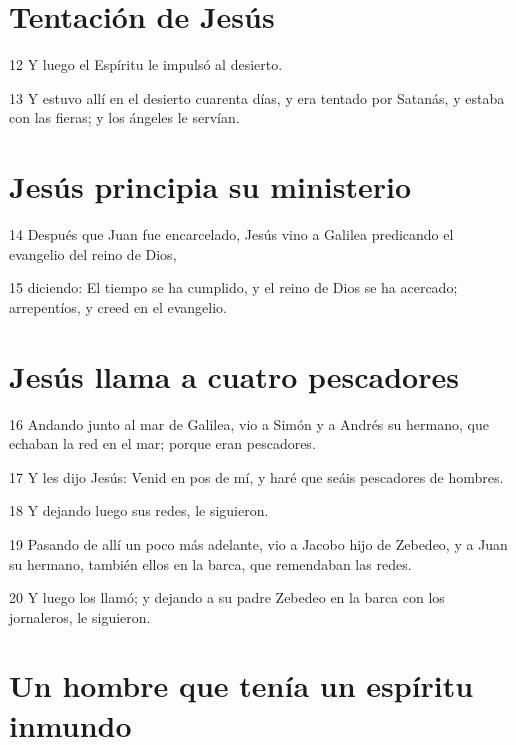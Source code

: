 \section*{Tentación de Jesús}

\par 12 Y luego el Espíritu le impulsó al desierto.
\par 13 Y estuvo allí en el desierto cuarenta días, y era tentado por Satanás, y estaba con las fieras; y los ángeles le servían.

\section*{Jesús principia su ministerio}

\par 14 Después que Juan fue encarcelado, Jesús vino a Galilea predicando el evangelio del reino de Dios,
\par 15 diciendo: El tiempo se ha cumplido, y el reino de Dios se ha acercado; arrepentíos, y creed en el evangelio.

\section*{Jesús llama a cuatro pescadores}

\par 16 Andando junto al mar de Galilea, vio a Simón y a Andrés su hermano, que echaban la red en el mar; porque eran pescadores.
\par 17 Y les dijo Jesús: Venid en pos de mí, y haré que seáis pescadores de hombres.
\par 18 Y dejando luego sus redes, le siguieron.
\par 19 Pasando de allí un poco más adelante, vio a Jacobo hijo de Zebedeo, y a Juan su hermano, también ellos en la barca, que remendaban las redes.
\par 20 Y luego los llamó; y dejando a su padre Zebedeo en la barca con los jornaleros, le siguieron.

\section*{Un hombre que tenía un espíritu inmundo}

